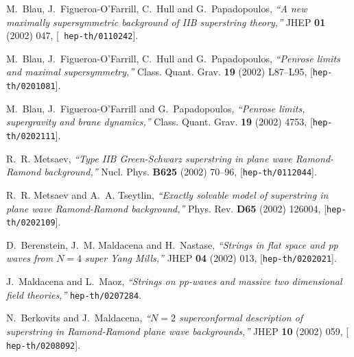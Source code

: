 \documentclass[a4paper,12pt]{article}
\numberwithin{equation}{section}
\begin{document}

%
%

\providecommand{\href}[2]{#2}\begingroup\raggedright\begin{thebibliography}{10}

M.~Blau, J.~Figueroa-O'Farrill, C.~Hull and G.~Papadopoulos, {\it ``A new
  maximally supersymmetric background of {IIB} superstring theory,''}  JHEP
  {\bf 01} (2002) 047, [\href{http://arXiv.org/abs/hep-th/0110242}{{\tt
  hep-th/0110242}}].

M.~Blau, J.~Figueroa-O'Farrill, C.~Hull and G.~Papadopoulos, {\it ``Penrose
  limits and maximal supersymmetry,''}  Class. Quant. Grav. {\bf 19} (2002)
  L87--L95, [\href{http://arXiv.org/abs/hep-th/0201081}{{\tt hep-th/0201081}}].

M.~Blau, J.~Figueroa-O'Farrill and G.~Papadopoulos, {\it ``Penrose limits,
  supergravity and brane dynamics,''}  Class. Quant. Grav. {\bf 19} (2002)
  4753, [\href{http://arXiv.org/abs/hep-th/0202111}{{\tt hep-th/0202111}}].

R.~R. Metsaev, {\it ``Type {IIB} {G}reen-{S}chwarz superstring in plane wave
  {R}amond-{R}amond background,''}  Nucl. Phys. {\bf B625} (2002) 70--96,
  [\href{http://arXiv.org/abs/hep-th/0112044}{{\tt hep-th/0112044}}].

R.~R. Metsaev and A.~A. Tseytlin, {\it ``Exactly solvable model of superstring
  in plane wave {R}amond-{R}amond background,''}  Phys. Rev. {\bf D65} (2002)
  126004, [\href{http://arXiv.org/abs/hep-th/0202109}{{\tt hep-th/0202109}}].

D.~Berenstein, J.~M. Maldacena and H.~Nastase, {\it ``Strings in flat space and
  pp waves from {$N = 4$} super {Y}ang {M}ills,''}  JHEP {\bf 04} (2002) 013,
  [\href{http://arXiv.org/abs/hep-th/0202021}{{\tt hep-th/0202021}}].

J.~Maldacena and L.~Maoz, {\it ``Strings on pp-waves and massive two
  dimensional field theories,''}
  \href{http://arXiv.org/abs/hep-th/0207284}{{\tt hep-th/0207284}}.

N.~Berkovits and J.~Maldacena, {\it ``{$N = 2$} superconformal description of
  superstring in {R}amond-{R}amond plane wave backgrounds,''}  JHEP {\bf 10}
  (2002) 059, [\href{http://arXiv.org/abs/hep-th/0208092}{{\tt
  hep-th/0208092}}].


\end{thebibliography}
\end{document}
